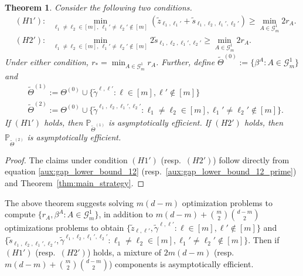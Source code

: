 \documentclass[aap,preprint]{imsart}
\newcommand{\Mstar}{[m]}
\newcommand{\Pro}{{\mathbb{P}}}
\theoremstyle{plain}
\newtheorem{theorem}{Theorem}[section]
\theoremstyle{definition}
\begin{document}
\begin{theorem}
\label{thm:Gap_sufficient}
Consider the following two conditions.
\begin{align*}
& (H1'): \;\;\min_{\ell_1 \neq \ell_2 \in \Mstar, \ \ell_1' \neq \ell_2'  \not \in \Mstar } \left(\tilde{z}_{\ell_1, \ell_1'} + 
\tilde{s}_{\ell_1,\ell_2,\ell_1',\ell_2'}\right) \geq \min_{A \in \mathcal{G}_m^{1}} 2  r_{A}.\\
& (H2'): \;\;\min_{\ell_1\neq \ell_2 \in \Mstar,\  \ell_1'\neq \ell_2'  \not\in \Mstar} 
2\tilde{s}_{\ell_1,\ell_2,\ell_1',\ell_2'}\geq  \min_{A \in \mathcal{G}_m^{1}} 2r_{A}.
\end{align*}
Under either condition, $r_* =  \min_{A \in \mathcal{G}_m^{1}} r_{A}$. Further, define $\widetilde{\Theta}^{(0)}  :=  \{\beta^{A}: A \in \mathcal{G}_m^{1}\}$ and
\begin{align*}
&\widetilde{\Theta}^{(1)}  :=  \Theta^{(0)} \cup \{\tilde{\gamma}^{\ell,\ell'}: \ell \in \Mstar, \ell'  \not \in \Mstar\}\\
&\widetilde{\Theta}^{(2)}  :=  \Theta^{(0)} \cup \{\tilde{\gamma}^{\ell_1,\ell_2,\ell_1',\ell_2'}: \ell_1 \neq \ell_2 \in \Mstar, \ell_1' \neq \ell_2' \not \in \Mstar\}.
\end{align*}
If $(H1')$ holds, then $\Pro_{\widetilde{\Theta}^{(1)}}$ is asymptotically efficient. If $(H2')$ holds, then $\Pro_{\widetilde{\Theta}^{(2)}}$ is asymptotically efficient.
\end{theorem}
\begin{proof}
The claims under condition $(H1')$ (resp.~$(H2')$) follow directly from equation \eqref{aux:gap_lower_bound_12} (resp.~\eqref{aux:gap_lower_bound_12_prime}) and Theorem~\ref{thm:main_strategy}.
\end{proof}

The above theorem suggests solving $m(d-m)$ optimization problems to compute $\{r_A, \beta^{A}: A \in \mathcal{G}_m^{1}\}$, in addition to $m(d-m) + \binom{m}{2}\binom{d-m}{2}$ optimizations problems to obtain 
$\{\tilde{z}_{\ell,\ell'}, \tilde{\gamma}^{\ell,\ell'}: \ell \in \Mstar, \ell' \not \in \Mstar\}$ and
$\{\tilde{s}_{\ell_1,\ell_2,\ell_1',\ell_2'}, \tilde{\gamma}^{\ell_1,\ell_2,\ell_1',\ell_2'}: \ell_1\neq \ell_2 \in \Mstar, \ell_1'\neq \ell_2' \not \in \Mstar\}$. Then if $(H1')$ (resp.~$(H2')$) holds, a mixture of $2m(d-m)$ (resp.~$m(d-m)+\binom{m}{2}\binom{d-m}{2}$) components is asymptotically efficient.
\end{document}
